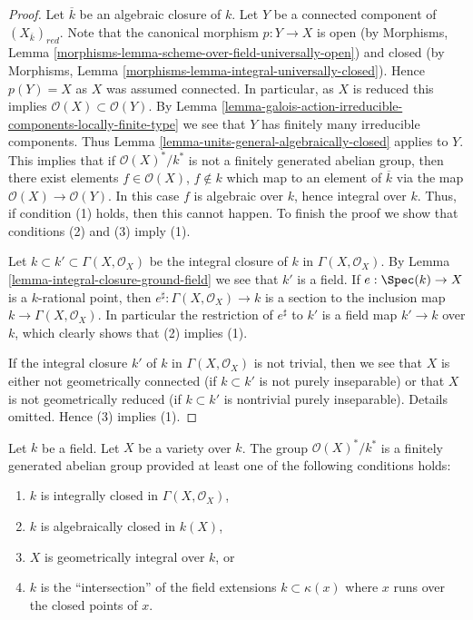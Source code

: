 \begin{proof}
Let $\overline{k}$ be an algebraic closure of $k$.
Let $Y$ be a connected component of $(X_{\overline{k}})_{red}$.
Note that the canonical morphism $p : Y \to X$ is open (by
Morphisms, Lemma \ref{morphisms-lemma-scheme-over-field-universally-open})
and closed (by
Morphisms, Lemma \ref{morphisms-lemma-integral-universally-closed}).
Hence $p(Y) = X$ as $X$ was assumed connected. In particular, as
$X$ is reduced this implies $\mathcal{O}(X) \subset \mathcal{O}(Y)$. By
Lemma \ref{lemma-galois-action-irreducible-components-locally-finite-type}
we see that $Y$ has finitely many irreducible components.
Thus
Lemma \ref{lemma-units-general-algebraically-closed}
applies to $Y$. This implies that if $\mathcal{O}(X)^*/k^*$ is
not a finitely generated abelian group, then there exist elements
$f \in \mathcal{O}(X)$, $f \not \in k$ which map to an element of
$\overline{k}$ via the map $\mathcal{O}(X) \to \mathcal{O}(Y)$.
In this case $f$ is algebraic over $k$, hence
integral over $k$. Thus, if condition (1) holds, then this cannot happen.
To finish the proof we show that conditions (2) and (3) imply (1).

\medskip\noindent
Let $k \subset k' \subset \Gamma(X, \mathcal{O}_X)$ be the integral
closure of $k$ in $\Gamma(X, \mathcal{O}_X)$. By
Lemma \ref{lemma-integral-closure-ground-field}
we see that $k'$ is a field.
If $e : \Spec(k) \to X$ is a $k$-rational point, then
$e^\sharp : \Gamma(X, \mathcal{O}_X) \to k$ is a section to the
inclusion map $k \to \Gamma(X, \mathcal{O}_X)$. In particular the
restriction of $e^\sharp$ to $k'$ is a field map $k' \to k$ over $k$,
which clearly shows that (2) implies (1).

\medskip\noindent
If the integral closure $k'$ of $k$ in $\Gamma(X, \mathcal{O}_X)$
is not trivial, then we see that $X$ is either not geometrically connected
(if $k \subset k'$ is not purely inseparable) or that $X$ is not
geometrically reduced (if $k \subset k'$ is nontrivial purely inseparable).
Details omitted. Hence (3) implies (1).
\end{proof}

\begin{lemma}
\label{lemma-units-variety}
Let $k$ be a field.
Let $X$ be a variety over $k$.
The group $\mathcal{O}(X)^*/k^*$ is a finitely generated abelian group
provided at least one of the following conditions holds:
\begin{enumerate}
\item $k$ is integrally closed in $\Gamma(X, \mathcal{O}_X)$,
\item $k$ is algebraically closed in $k(X)$,
\item $X$ is geometrically integral over $k$, or
\item $k$ is the ``intersection'' of the field extensions
$k \subset \kappa(x)$ where $x$ runs over the closed points of $x$.
\end{enumerate}
\end{lemma}

